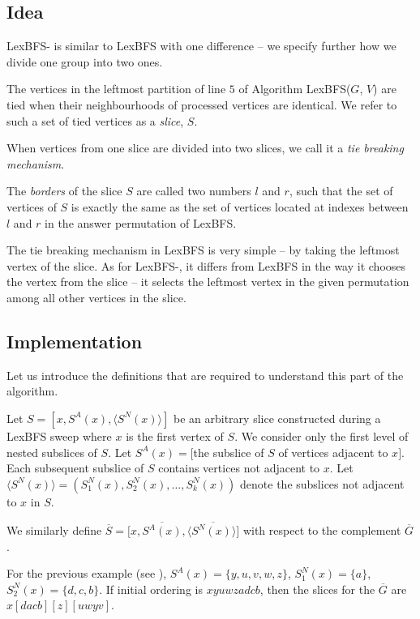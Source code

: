 \subsection{Idea}
LexBFS- is similar to LexBFS with one difference -- we specify further how we divide one group into two ones.
\begin{definition}
    The vertices in the leftmost partition of line $5$ of Algorithm LexBFS($G$, $V$) are tied when their neighbourhoods of processed vertices are
identical. We refer to such a set of tied vertices as a \emph{slice}, $S$.

When vertices from one slice are divided into two slices, we call it a \emph{tie breaking mechanism}.

The \emph{borders} of the slice $S$ are called two numbers $l$ and $r$, such that the set of vertices of $S$ is exactly the same as the set of vertices located at indexes between $l$ and $r$ in the answer permutation of LexBFS. 
\end{definition}
The tie breaking mechanism in LexBFS is very simple -- by taking the leftmost vertex of the slice. As for LexBFS-, it differs from LexBFS in the way it chooses the vertex from the slice -- it selects the leftmost vertex in the given permutation among all other vertices in the slice.

\subsection{Implementation}
Let us introduce the definitions that are required to understand this part of the algorithm.

\begin{definition}
    Let $S = [x, S^A(x), \langle S^N(x) \rangle]$ be an arbitrary slice constructed during a LexBFS sweep where $x$ is the first vertex of $S$. We consider only the first level of nested subslices of $S$. Let $S^A(x) = [$the subslice of $S$ of vertices adjacent to $x]$. Each subsequent subslice of $S$ contains vertices not adjacent to $x$. Let $\langle S^N(x)\rangle = (S^N_1(x), S^N_2(x), \ldots , S^N_k(x))$ denote the subslices not adjacent to $x$ in $S$.

    We similarly define $\overline{S} = [x, \overline{S^A(x)}, \overline{\langle S^N(x) \rangle]}$ with respect to the complement $\overline{G}$.
\end{definition}

For the previous example (see ), $S^A(x) = \{y, u, v, w, z\}$, $S^N_1(x) = \{a\}$, $S^N_2(x) = \{d, c, b\}$. If initial ordering is $x y u w z a d c b$, then the slices for the $\overline{G}$ are $x[dacb][z][uwyv]$.

